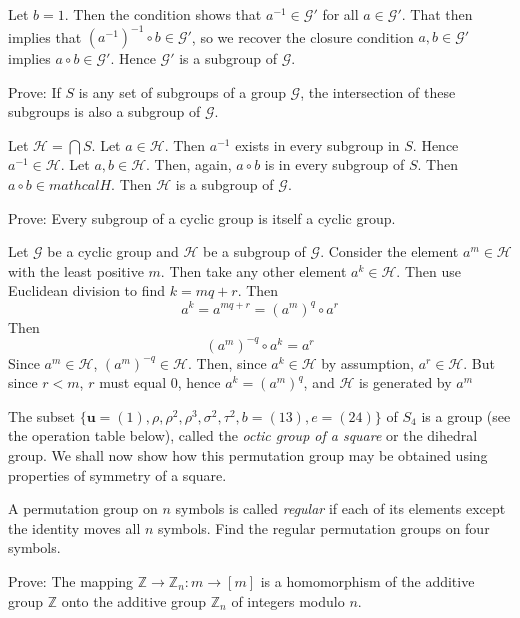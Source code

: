 \answer
Let $b = 1$. Then the condition shows that $a^{-1} \in \mathcal{G}'$ for all $a \in \mathcal{G}'$. That then implies that $(a^{-1})^{-1} \circ b \in \mathcal{G}'$, so we recover the closure condition $a, b \in \mathcal{G}'$ implies $a \circ b \in \mathcal{G}'$. Hence $\mathcal{G}'$ is a subgroup of $\mathcal{G}$.


\exercise 
Prove: If $S$ is any set of subgroups of a group $\mathcal{G}$, the intersection of these subgroups is also a subgroup of $\mathcal{G}$.

\answer
Let $\mathcal{H} = \bigcap S$. Let $a \in \mathcal{H}$. Then $a^{-1}$ exists in every subgroup in $S$. Hence $a^{-1} \in \mathcal{H}$. Let $a, b \in \mathcal{H}$. Then, again, $a \circ b$ is in every subgroup of $S$. Then $a \circ b \in mathcal{H}$. Then $\mathcal{H}$ is a subgroup of $\mathcal{G}$.


\exercise
Prove: Every subgroup of a cyclic group is itself a cyclic group.

\answer
Let $\mathcal{G}$ be a cyclic group and $\mathcal{H}$ be a subgroup of $\mathcal{G}$. Consider the element $a^m \in \mathcal{H}$ with the least positive $m$. Then take any other element $a^k \in \mathcal{H}$. Then use Euclidean division to find $k = mq + r$. Then
\[a^k = a^{mq+r} = (a^m)^q \circ a^r\]
Then
\[(a^m)^{-q} \circ a^k = a^r\]
Since $a^m \in \mathcal{H}$, $(a^m)^{-q} \in \mathcal{H}$. Then, since $a^k \in \mathcal{H}$ by assumption, $a^r \in \mathcal{H}$. But since $r < m$, $r$ must equal $0$, hence $a^k = (a^m)^q$, and $\mathcal{H}$ is generated by $a^m$


\exercise
The subset $\{\mathbf{u} = (1), \rho, \rho^2, \rho^3, \sigma^2, \tau^2, b = (13), e = (24)\}$ of $S_4$ is a group (see the operation table below), called the \textit{octic group of a square} or the {dihedral group}. We shall now show how this permutation group may be obtained using properties of symmetry of a square.

\answer


\exercise A permutation group on $n$ symbols is called \textit{regular} if each of its elements except the identity moves all $n$ symbols. Find the regular permutation groups on four symbols.

\answer


\exercise
Prove: The mapping $\mathbb{Z} \to \mathbb{Z}_n: m \to [m]$ is a homomorphism of the additive group $\mathbb{Z}$ onto the additive group $\mathbb{Z}_n$ of integers modulo $n$.

\answer


